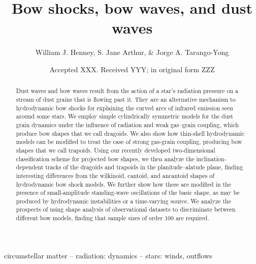 \documentclass[useAMS, usenatbib, a4paper]{mnras}
\title
{Bow shocks, bow waves, and dust waves}
\author[Henney, Arthur, \& Tarango Yong]{
  William J. Henney, S. Jane Arthur, \& Jorge A. Tarango-Yong\\
  \AddressCRyA
}
\date{Accepted XXX. Received YYY; in original form ZZZ}
\begin{document}
\label{firstpage}
\pagerange{\pageref{firstpage}--\pageref{lastpage}}
\maketitle
\begin{abstract}
  Dust waves and bow waves result from the action of a star's
  radiation pressure on a stream of dust grains that is flowing past
  it.  They are an alternative mechanism to hydrodynamic bow shocks
  for explaining the curved arcs of infrared emission seen around some
  stars.  We employ simple cylindrically symmetric models for the dust
  grain dynamics under the influence of radiation and weak gas--grain
  coupling, which produce bow shapes that we call dragoids.  We also
  show how thin-shell hydrodynamic models can be modified to treat the
  case of strong gas-grain coupling, producing bow shapes that we call
  trapoids.  Using our recently developed two-dimensional
  classification scheme for projected bow shapes, we then analyze the
  inclination-dependent tracks of the dragoids and trapoids in the
  planitude--alatude plane, finding interesting differences from the
  wilkinoid, cantoid, and ancantoid shapes of hydrodynamic bow shock
  models. We further show how these are modified in the presence of
  small-amplitude standing-wave oscillations of the basic shape, as
  may be produced by hydrodynamic instabilities or a time-varying
  source.  We analyze the prospects of using shape analysis of
  observational datasets to discriminate between different bow models,
  finding that sample sizes of order 100 are required.
\end{abstract}

\begin{keywords}
  circumstellar matter -- radiation: dynamics -- stars: winds, outflows
\end{keywords}







\appendix





\bsp	%
\label{lastpage}
\end{document}
